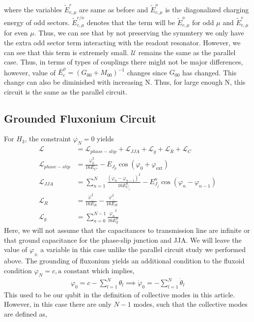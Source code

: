 \documentclass[%
reprint,
superscriptaddress,
 amsmath,amssymb,
 aps,
 prx,
longbibliography,
floatfix,
]{revtex4-2}
\begin{document}
 where the variables $\tilde{E}^e_{c,\mu}$ are same as before and $\tilde{E}^o_{c,\mu}$ is the diagonalized charging energy of odd sectors. $\tilde{E}^{e/o}_{c,\mu}$ denotes that the term will be $\tilde{E}^{o}_{c,\mu}$ for odd $\mu$ and $\tilde{E}^{e}_{c,\mu}$ for even $\mu$. Thus, we can see that by not preserving the symmtery we only have the extra odd sector term interacting with the readout resonator. However, we can see that this term is extremely small. $\mathcal{U}$ remains the same as the parallel case. Thus, in terms of types of couplings there might not be major differences, however, value of $\bar{E}_c^\phi=(G_{00}+M_{00})^{-1}$ changes since $G_{00}$ has changed. This change can also be diminished with increasing N. Thus, for large enough N, this circuit is the same as the parallel circuit. 
\subsection{Grounded Fluxonium Circuit}
For $H_3$, the constraint $\dot{\varphi_{N}}=0$ yields
\begin{align}
    \mathcal{L}&=\mathcal{L}_{phase-slip}+\mathcal{L}_{JJA}+\mathcal{L}_{g}+\mathcal{L}_{R}+\mathcal{L}_{C}\\
    \mathcal{L}_{phase-slip}&=\frac{\dot{\varphi}_0^2}{16E_{C'}}-E_{J_p}\cos(\varphi_0+\varphi_\mathrm{ext})\\
    \mathcal{L}_{JJA}&=\sum_{n=1}^N\frac{(\dot{\varphi}_n-\dot{\varphi}_{n-1})^2}{16E^{n}_{C_j}}-E^{n}_{J_j}\cos(\varphi_n-\varphi_{n-1})\\
    \mathcal{L}_{R}&=\frac{\dot{\varphi}_{-}^2}{16E_{{R}}}-\frac{\varphi_{-}^2}{16E_{R}}\\
    \mathcal{L}_{g}&=\sum_{n=0}^{N-1} \frac{\dot{\varphi_n}^2}{16E^n_{g}}
  \end{align}
  Here, we will not assume that the capacitances to transmission line are infinite or that ground capacitance for the phase-slip junction and JJA. We will leave the value of $\varphi_{\pm}$ a variable in this case unlike the parallel circuit study we performed above. 
The grounding of fluxonium yields an additional condition to the fluxoid condition $\varphi_N=c, \text{a constant}$ which implies,
\begin{align}
     \varphi_0=c-\sum_{l=1}^N \theta_l\implies \dot\varphi_0=-\sum_{l=1}^N \dot\theta_l
\end{align}
This used to be our qubit in the definition of collective modes in this article. However, in this case there are only $N-1$ modes, such that the collective modes are defined as,
\end{document}
